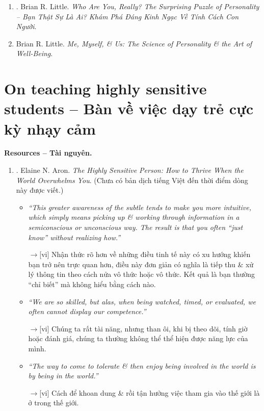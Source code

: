 \documentclass[12pt,twoside]{book}
\begin{document}
\begin{enumerate}
\begin{itemize}
		{\sf Content}: What makes you an introvert $\to$ Early memories $\to$ High on neuroticism.
		
		{\sf[en]$\to$[vi]} {\sf Nội dung}: Điều gì khiến bạn trở thành người hướng nội $\to$ Ký ức ban đầu $\to$ Dễ bị kích động.
	\end{itemize}
	Với bản dịch tiếng Việt:
	\item \cite{Little_personality_VN}. {\sc Brian R. Little}. {\it Who Are You, Really? The Surprising Puzzle of Personality -- Bạn Thật Sự Là Ai? Khám Phá Đáng Kinh Ngạc Về Tính Cách Con Người}.
	\item {\sc Brian R. Little}. {\it Me, Myself, \& Us: The Science of Personality \& the Art of Well-Being}.
\end{enumerate}

\section{On teaching highly sensitive students -- Bàn về việc dạy trẻ cực kỳ nhạy cảm}
{\bf \textsf{Resources -- Tài nguyên.}}
\begin{enumerate}
	\item \cite{Aron_HSP}. {\sc Elaine N. Aron}. {\it The Highly Sensitive Person: How to Thrive When the World Overwhelms You}. (Chưa có bản dịch tiếng Việt đến thời điểm dòng này được viết.)
	\begin{itemize}
		\item {\it``This greater awareness of the subtle tends to make you more intuitive, which simply means picking up \& working through information in a semiconscious or unconscious way. The result is that you often ``just know'' without realizing how.''}
		
		{\sf[en]$\to$[vi]} Nhận thức rõ hơn về những điều tinh tế này có xu hướng khiến bạn trở nên trực quan hơn, điều này đơn giản có nghĩa là tiếp thu \& xử lý thông tin theo cách nửa vô thức hoặc vô thức. Kết quả là bạn thường ``chỉ biết'' mà không hiểu bằng cách nào.		
		
		\item {\it``We are so skilled, but alas, when being watched, timed, or evaluated, we often cannot display our competence.''}
		
		{\sf[en]$\to$[vi]} Chúng ta rất tài năng, nhưng than ôi, khi bị theo dõi, tính giờ hoặc đánh giá, chúng ta thường không thể thể hiện được năng lực của mình.
		
		\item {\it``The way to come to tolerate \& then enjoy being involved in the world is by being in the world.''}
		
		{\sf[en]$\to$[vi]} Cách để khoan dung \& rồi tận hưởng việc tham gia vào thế giới là ở trong thế giới.
	\end{itemize}
\end{enumerate}
\end{document}
